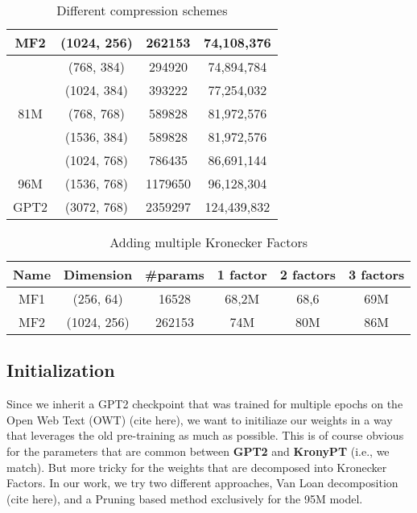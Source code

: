 \documentclass{article}
\begin{document}
{\begin{table}[htb!]
\begin{tabular}{|c|c|c|c|}
MF2		&  (1024, 256)      &   262153     & 74,108,376  \\ \hline 
		&  (768, 384)       &   294920     & 74,894,784  \\ \hline
		&  (1024, 384)      &   393222     & 77,254,032  \\ \hline
81M 	&  (768, 768)       &   589828     & 81,972,576  \\ \hline
		&  (1536, 384)      &   589828     & 81,972,576  \\ \hline
		&  (1024, 768)      &   786435     & 86,691,144  \\ \hline
96M		&  (1536, 768)      &   1179650    & 96,128,304  \\ \hline
GPT2	&  (3072, 768)      &   2359297    & 124,439,832 \\ \hline
\end{tabular}
\caption{Different compression schemes}
\end{table}


\begin{table}[htb!]
\centering
\begin{tabular}{|c|c|c|c|c|c|}
\hline
Name 	& Dimension 		& 	#params    & 1 factor    & 2 factors   & 3 factors     \\ \hline                                                                                 
MF1		&  (256, 64)        &   16528      & 68,2M       & 68,6  & 69M    \\ \hline
MF2		&  (1024, 256)      &   262153     & 74M         & 80M   & 86M    \\ \hline 
\end{tabular}
\caption{Adding multiple Kronecker Factors}
\end{table}


\newpage

\subsection{Initialization}%
\label{sub:Initialization}

Since we inherit a GPT2 checkpoint that was trained for multiple epochs on the Open Web Text (OWT) (cite here), we want to initiliaze our weights in a way that leverages the old pre-training as much as possible. This is of course obvious for the parameters that are common between \textbf{GPT2} and \textbf{KronyPT} (i.e., we match).  But more tricky for the weights that are decomposed into Kronecker Factors. In our work, we try two different approaches, Van Loan decomposition (cite here), and a Pruning based method exclusively for the 95M model.

}
\end{document}
